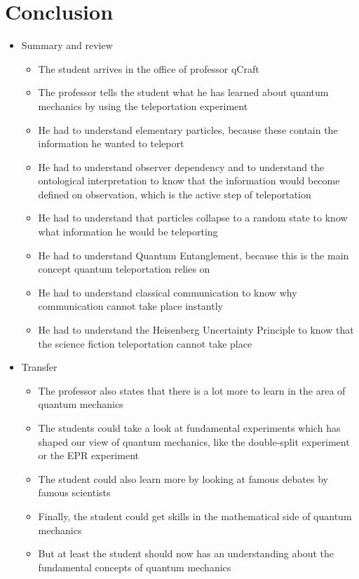 \documentclass[11pt,twoside]{report} %
\begin{document}
\section{Conclusion}

\begin{itemize}
	\item Summary and review
	\begin{itemize}
		\item The student arrives in the office of professor qCraft
		\item The professor tells the student what he has learned about quantum mechanics by using the teleportation experiment
		\item He had to understand elementary particles, because these contain the information he wanted to teleport
		\item He had to understand observer dependency and to understand the ontological interpretation to know that the information would become defined on observation, which is the active step of teleportation
		\item He had to understand that particles collapse to a random state to know what information he would be teleporting
		\item He had to understand Quantum Entanglement, because this is the main concept quantum teleportation relies on
		\item He had to understand classical communication to know why communication cannot take place instantly
		\item He had to understand the Heisenberg Uncertainty Principle to know that the science fiction teleportation cannot take place
	\end{itemize}
	\item Transfer
	\begin{itemize}
		\item The professor also states that there is a lot more to learn in the area of quantum mechanics
		\item The students could take a look at fundamental experiments which has shaped our view of quantum mechanics, like the double-split experiment or the EPR experiment
		\item The student could also learn more by looking at famous debates by famous scientists
		\item Finally, the student could get skills in the mathematical side of quantum mechanics
		\item But at least the student should now has an understanding about the fundamental concepts of quantum mechanics

\end{itemize}
\end{itemize}
\end{document}
